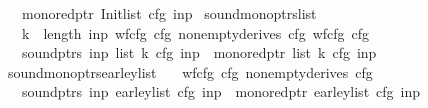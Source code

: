 \begin{isabellebody}
\ \ \ {\isachardoublequoteopen}mono{\isacharunderscore}{\kern0pt}red{\isacharunderscore}{\kern0pt}ptr\ {\isacharparenleft}{\kern0pt}Init{\isacharunderscore}{\kern0pt}list\ cfg\ inp{\isacharparenright}{\kern0pt}{\isachardoublequoteclose}%
\isadelimproof
%
\endisadelimproof
%
\isatagproof
%
\endisatagproof
{\isafoldproof}%
%
\isadelimproof
\isanewline
%
\endisadelimproof
{}\isamarkupfalse%
\ sound{\isacharunderscore}{\kern0pt}mono{\isacharunderscore}{\kern0pt}ptrs{\isacharunderscore}{\kern0pt}{\isasymE}{\isacharunderscore}{\kern0pt}list{\isacharcolon}{\kern0pt}\isanewline
\ \ \ {\isachardoublequoteopen}k\ {\isasymle}\ length\ inp{\isachardoublequoteclose}\ {\isachardoublequoteopen}wf{\isacharunderscore}{\kern0pt}cfg\ cfg{\isachardoublequoteclose}\ {\isachardoublequoteopen}nonempty{\isacharunderscore}{\kern0pt}derives\ cfg{\isachardoublequoteclose}\ {\isachardoublequoteopen}wf{\isacharunderscore}{\kern0pt}cfg\ cfg{\isachardoublequoteclose}\isanewline
\ \ \ {\isachardoublequoteopen}sound{\isacharunderscore}{\kern0pt}ptrs\ inp\ {\isacharparenleft}{\kern0pt}{\isasymE}{\isacharunderscore}{\kern0pt}list\ k\ cfg\ inp{\isacharparenright}{\kern0pt}\ {\isasymand}\ mono{\isacharunderscore}{\kern0pt}red{\isacharunderscore}{\kern0pt}ptr\ {\isacharparenleft}{\kern0pt}{\isasymE}{\isacharunderscore}{\kern0pt}list\ k\ cfg\ inp{\isacharparenright}{\kern0pt}{\isachardoublequoteclose}%
\isadelimproof
%
\endisadelimproof
%
\isatagproof
%
\endisatagproof
{\isafoldproof}%
%
\isadelimproof
\isanewline
%
\endisadelimproof
{}\isamarkupfalse%
\ sound{\isacharunderscore}{\kern0pt}mono{\isacharunderscore}{\kern0pt}ptrs{\isacharunderscore}{\kern0pt}earley{\isacharunderscore}{\kern0pt}list{\isacharcolon}{\kern0pt}\isanewline
\ \ \ {\isachardoublequoteopen}wf{\isacharunderscore}{\kern0pt}cfg\ cfg{\isachardoublequoteclose}\ {\isachardoublequoteopen}nonempty{\isacharunderscore}{\kern0pt}derives\ cfg{\isachardoublequoteclose}\isanewline
\ \ \ {\isachardoublequoteopen}sound{\isacharunderscore}{\kern0pt}ptrs\ inp\ {\isacharparenleft}{\kern0pt}earley{\isacharunderscore}{\kern0pt}list\ cfg\ inp{\isacharparenright}{\kern0pt}\ {\isasymand}\ mono{\isacharunderscore}{\kern0pt}red{\isacharunderscore}{\kern0pt}ptr\ {\isacharparenleft}{\kern0pt}earley{\isacharunderscore}{\kern0pt}list\ cfg\ inp{\isacharparenright}{\kern0pt}{\isachardoublequoteclose}%
\isadelimproof
%
\endisadelimproof
%
\isatagproof
%
\endisatagproof
{\isafoldproof}%
%
\isadelimproof
%
\endisadelimproof
%
\isadelimdocument

\end{isabellebody}
